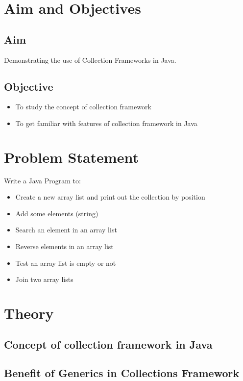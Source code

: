\documentclass[11pt]{article}
\begin{document}
\tableofcontents
\thispagestyle{empty}
\clearpage


\setcounter{page}{1}

\section{Aim and Objectives}
\subsection*{Aim}
Demonstrating the use of Collection Frameworks in Java.
\subsection*{Objective}
\begin{itemize}
	\item To study the concept of collection framework
	\item To get familiar with features of collection framework in Java
\end{itemize}
\section{Problem Statement}
Write a Java Program to: 
\begin{itemize}
	\item Create a new array list and print out the collection by position
	\item Add some elements (string)
	\item Search an element in an array list
	\item Reverse elements in an array list
	\item Test an array list is empty or not
	\item Join two array lists
\end{itemize}
	
\section{Theory}
\subsection{Concept of collection framework in Java}

\subsection{Benefit of Generics in Collections Framework}
\end{document}
